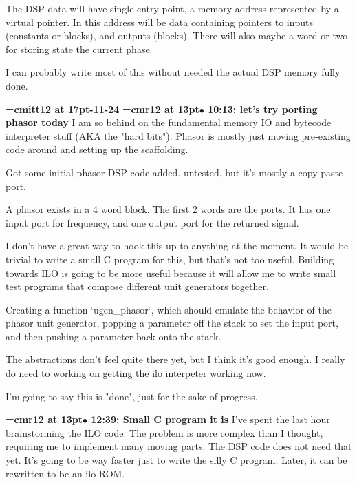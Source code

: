The DSP data will have single entry point, a memory address represented by a virtual pointer. In this address will be data containing pointers to inputs (constants or blocks), and outputs (blocks). There will also maybe a word or two for storing state the current phase.
\par

I can probably write most of this without needed the actual DSP memory fully done.
\par

{\medskip\noindent\bf\font\titlefont=cmitt12 at 17pt-11-24}\medskip
{\smallskip\noindent\bf\font\titlefont=cmr12 at 13pt\titlefont $\bullet$ 10:13: let's try porting phasor today}\smallskip
I am so behind on the fundamental memory IO and bytecode interpreter stuff (AKA the "hard bits"). Phasor is mostly just moving pre-existing code around and setting up the scaffolding.
\par

Got some initial phasor DSP code added. untested, but it's mostly a copy-paste port.
\par

A phasor exists in a 4 word block. The first 2 words are the ports. It has one input port for frequency, and one output port for the returned signal.
\par

I don't have a great way to hook this up to anything at the moment. It would be trivial to write a small C program for this, but that's not too useful. Building towards ILO is going to be more useful because it will allow me to write small test programs that compose different unit generators together.
\par

Creating a function `ugen\_phasor`, which should emulate the behavior of the phasor unit generator, popping a parameter off the stack to set the input port, and then pushing a parameter back onto the stack.
\par

The abstractions don't feel quite there yet, but I think it's good enough. I really do need to working on getting the ilo interpeter working now.
\par

I'm going to say this is "done", just for the sake of progress.
\par

{\smallskip\noindent\bf\font\titlefont=cmr12 at 13pt\titlefont $\bullet$ 12:39: Small C program it is}\smallskip
I've spent the last hour brainstorming the ILO code. The problem is more complex than I thought, requiring me to implement many moving parts. The DSP code does not need that yet. It's going to be way faster just to write the silly C program. Later, it can be rewritten to be an ilo ROM.
\par

